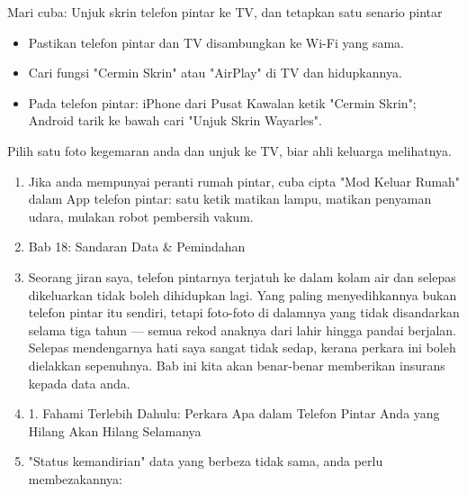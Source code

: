 
Mari cuba: Unjuk skrin telefon pintar ke TV, dan tetapkan satu senario pintar

\begin{itemize}
  \item Pastikan telefon pintar dan TV disambungkan ke Wi-Fi yang sama.
  \item Cari fungsi "Cermin Skrin" atau "AirPlay" di TV dan hidupkannya.
  \item Pada telefon pintar: iPhone dari Pusat Kawalan ketik "Cermin Skrin"; Android tarik ke bawah cari "Unjuk Skrin Wayarles".
\end{itemize}

\begin{tcbpractice}{Pilih satu foto kegemaran anda dan unjuk ke TV, biar ahli keluarga melihatnya.}
\begin{enumerate}
  \item Jika anda mempunyai peranti rumah pintar, cuba cipta "Mod Keluar Rumah" dalam App telefon pintar: satu ketik matikan lampu, matikan penyaman udara, mulakan robot pembersih vakum.
  \item Bab 18: Sandaran Data \& Pemindahan
  \item Seorang jiran saya, telefon pintarnya terjatuh ke dalam kolam air dan selepas dikeluarkan tidak boleh dihidupkan lagi. Yang paling menyedihkannya bukan telefon pintar itu sendiri, tetapi foto-foto di dalamnya yang tidak disandarkan selama tiga tahun — semua rekod anaknya dari lahir hingga pandai berjalan. Selepas mendengarnya hati saya sangat tidak sedap, kerana perkara ini boleh dielakkan sepenuhnya. Bab ini kita akan benar-benar memberikan insurans kepada data anda.
  \item 1. Fahami Terlebih Dahulu: Perkara Apa dalam Telefon Pintar Anda yang Hilang Akan Hilang Selamanya
  \item "Status kemandirian" data yang berbeza tidak sama, anda perlu membezakannya:
\end{enumerate}

\end{tcbpractice}

